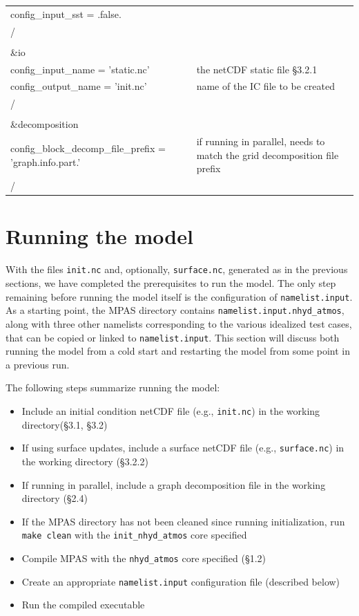 \documentclass[11pt]{report}
\begin{document}
\begin{longtable}{p{3.0in} |p{3.25in}}
   config\_input\_sst       = .false.                & \\
/\\
\\
\&io\\
   config\_input\_name         = 'static.nc'         & the netCDF static file \S 3.2.1 \\
   config\_output\_name        = 'init.nc'           & name of the IC file to be created \\
/\\
\\
\&decomposition\\
   config\_block\_decomp\_file\_prefix = 'graph.info.part.' & if running in parallel, needs to match the grid decomposition file prefix \\
/\\
\end{longtable}


\section{Running the model}

With the files {\tt init.nc} and, optionally, {\tt surface.nc}, generated as in the previous sections, we have completed the prerequisites to run the model.  The only step remaining before running the model itself is the configuration of {\tt namelist.input}.  As a starting point, the MPAS directory contains {\tt namelist.input.nhyd\_atmos}, along with three other namelists corresponding to the various idealized test cases, that can be copied or linked to {\tt namelist.input}.  This section will discuss both running the model from a cold start and restarting the model from some point in a previous run.

The following steps summarize running the model:

\begin{itemize}
\item Include an initial condition netCDF file (e.g., {\tt init.nc}) in the working directory(\S 3.1, \S 3.2)
\item If using surface updates, include a surface netCDF file (e.g., {\tt surface.nc}) in the working directory (\S 3.2.2)
\item If running in parallel, include a graph decomposition file in the working directory (\S 2.4)
\item If the MPAS directory has not been cleaned since running initialization, run {\tt make clean} with the {\tt init\_nhyd\_atmos} core specified
\item Compile MPAS with the {\tt nhyd\_atmos} core specified (\S 1.2)
\item Create an appropriate {\tt namelist.input} configuration file (described below)
\item Run the compiled executable
\end{itemize}
\end{document}

